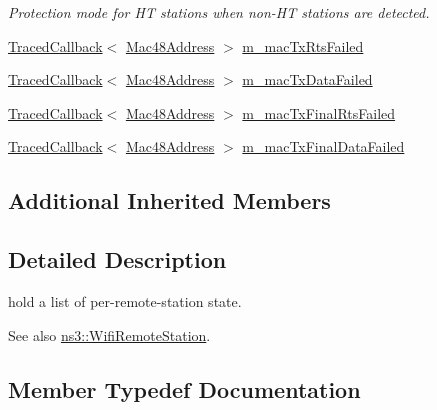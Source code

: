 \begin{DoxyCompactItemize}
\begin{DoxyCompactList}\small\item\em Protection mode for HT stations when non-\/\+HT stations are detected. \end{DoxyCompactList}\item 
\hyperlink{classns3_1_1TracedCallback}{Traced\+Callback}$<$ \hyperlink{classns3_1_1Mac48Address}{Mac48\+Address} $>$ \hyperlink{classns3_1_1WifiRemoteStationManager_a28c2c1347d68cd0e3e913fbef1daa00e}{m\+\_\+mac\+Tx\+Rts\+Failed}
\item 
\hyperlink{classns3_1_1TracedCallback}{Traced\+Callback}$<$ \hyperlink{classns3_1_1Mac48Address}{Mac48\+Address} $>$ \hyperlink{classns3_1_1WifiRemoteStationManager_aaf3abf468bb67a06c4726b8169d1c8f1}{m\+\_\+mac\+Tx\+Data\+Failed}
\item 
\hyperlink{classns3_1_1TracedCallback}{Traced\+Callback}$<$ \hyperlink{classns3_1_1Mac48Address}{Mac48\+Address} $>$ \hyperlink{classns3_1_1WifiRemoteStationManager_a5a826567a9ee581c77563479a6dffc53}{m\+\_\+mac\+Tx\+Final\+Rts\+Failed}
\item 
\hyperlink{classns3_1_1TracedCallback}{Traced\+Callback}$<$ \hyperlink{classns3_1_1Mac48Address}{Mac48\+Address} $>$ \hyperlink{classns3_1_1WifiRemoteStationManager_afc5bf08a7fbfd3e42a7fdd4d8ac5e966}{m\+\_\+mac\+Tx\+Final\+Data\+Failed}
\end{DoxyCompactItemize}
\subsection*{Additional Inherited Members}


\subsection{Detailed Description}
hold a list of per-\/remote-\/station state. 

\begin{DoxySeeAlso}{See also}
\hyperlink{structns3_1_1WifiRemoteStation}{ns3\+::\+Wifi\+Remote\+Station}. 
\end{DoxySeeAlso}


\subsection{Member Typedef Documentation}
